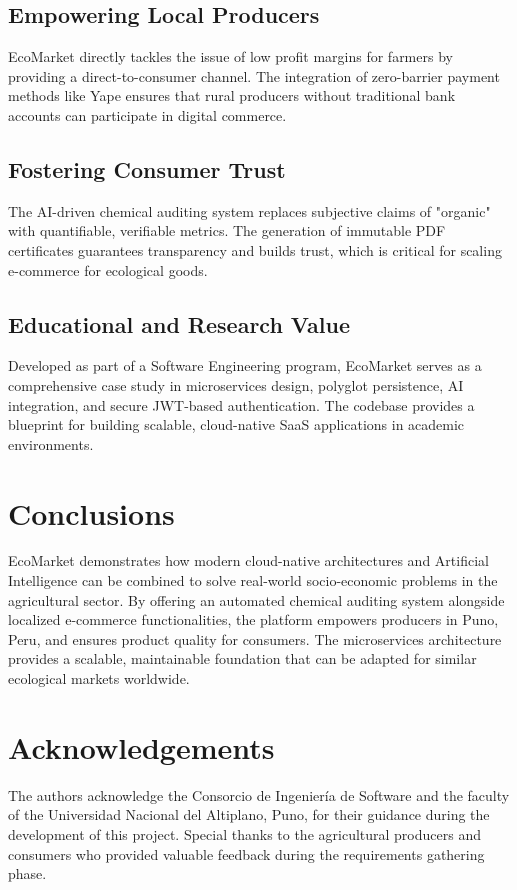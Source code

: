 \documentclass[preprint,12pt,a4paper]{elsarticle}
\begin{document}
\subsection*{Empowering Local Producers}
EcoMarket directly tackles the issue of low profit margins for farmers by providing a direct-to-consumer channel. The integration of zero-barrier payment methods like Yape ensures that rural producers without traditional bank accounts can participate in digital commerce.

\subsection*{Fostering Consumer Trust}
The AI-driven chemical auditing system replaces subjective claims of "organic" with quantifiable, verifiable metrics. The generation of immutable PDF certificates guarantees transparency and builds trust, which is critical for scaling e-commerce for ecological goods.

\subsection*{Educational and Research Value}
Developed as part of a Software Engineering program, EcoMarket serves as a comprehensive case study in microservices design, polyglot persistence, AI integration, and secure JWT-based authentication. The codebase provides a blueprint for building scalable, cloud-native SaaS applications in academic environments.

\section{Conclusions}

EcoMarket demonstrates how modern cloud-native architectures and Artificial Intelligence can be combined to solve real-world socio-economic problems in the agricultural sector. By offering an automated chemical auditing system alongside localized e-commerce functionalities, the platform empowers producers in Puno, Peru, and ensures product quality for consumers. The microservices architecture provides a scalable, maintainable foundation that can be adapted for similar ecological markets worldwide.

\section*{Acknowledgements}

The authors acknowledge the Consorcio de Ingeniería de Software and the faculty of the Universidad Nacional del Altiplano, Puno, for their guidance during the development of this project. Special thanks to the agricultural producers and consumers who provided valuable feedback during the requirements gathering phase.
\end{document}
